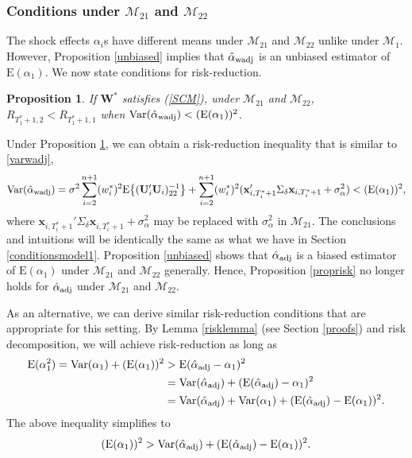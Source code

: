 \documentclass[11pt]{article}
\def\mbf#1{\mathbf{#1}} %
\def\mrm#1{\mathrm{#1}} %
\def\mc#1{\mathcal{#1}} %
\def\E#1{\mathrm{E}(#1)} %
\def\var#1{\mathrm{Var}(#1)} %
\newtheorem{prop}{Proposition}
\theoremstyle{definition}
\begin{document}
\subsubsection{Conditions under $\mc{M}_{21}$ and $\mc{M}_{22}$}
\label{conditionsm2122}

The shock effects $\alpha_i$s have different means under $\mc{M}_{21}$ and $\mc{M}_{22}$ unlike under $\mc{M}_1$. %
However, Proposition \ref{unbiased} implies that $\hat{\alpha}_{\rm wadj}$ is an unbiased estimator of $\E{\alpha_1}$. %
We now state conditions for risk-reduction.

\begin{prop}
\label{propriskwadj2} If $\mbf{W}^*$ satisfies (\ref{SCM}), under $\mc{M}_{21}$ and $\mc{M}_{22}$, $R_{T_1^*+1,2}<R_{T_1^*+1,1}$ when $\var{\hat{\alpha}_{\rm wadj}}<(\E{\alpha_1})^2$. 
\end{prop}
Under Proposition \ref{propriskwadj2}, we can obtain a risk-reduction inequality that is similar to \eqref{varwadj},
\begin{align*}
\var{\hat{\alpha}_{\rm wadj}}
 = \sigma^2\sum_{i=2}^{n+1}(w_i^*)^2\mrm{E}\big\{(\mbf{U}'_i\mbf{U}_i)^{-1}_{22}\big\} + \sum_{i=2}^{n+1} (w_i^*)^2 (\mbf{x}_{i, T_i^*+1}'\Sigma_{\delta}\mbf{x}_{i, T_i^*+1} + \sigma^2_{\alpha}) < (\E{\alpha_1})^2,
\end{align*}
where $\mbf{x}_{i, T_i^*+1}'\Sigma_{\delta}\mbf{x}_{i, T_i^*+1} + \sigma^2_{\alpha}$ may be replaced with $\sigma^2_{\alpha}$ in $\mc{M}_{21}$. The conclusions and intuitions will be identically the same as what we have in Section \ref{conditionsmodel1}. Proposition \ref{unbiased} shows that $\hat{\alpha}_{\rm adj}$ is a biased estimator of $\E{\alpha_1}$ under $\mc{M}_{21}$ and $\mc{M}_{22}$ generally. Hence, Proposition \ref{proprisk} no longer holds for $\hat{\alpha}_{\rm adj}$ under $\mc{M}_{21}$ and $\mc{M}_{22}$.

As an alternative, we can derive similar risk-reduction conditions that are appropriate for this setting. By Lemma \ref{risklemma} (see Section \ref{proofs}) and risk decomposition, we will achieve risk-reduction as long as
\begin{align*}
 \E{\alpha_1^2}= \var{\alpha_1}+(\E{\alpha_1})^2
 &>\E{\hat{\alpha}_{\rm adj}-\alpha_1}^2\\
  &=\var{\hat{\alpha}_{\rm adj}} +  (\E{\hat{\alpha}_{\rm adj}}-\alpha_1)^2 \\
  &=\var{\hat{\alpha}_{\rm adj}} +  \var{\alpha_1} + (\E{\hat{\alpha}_{\rm adj}}-\E{\alpha_1})^2.
\end{align*}
The above inequality simplifies to 
\begin{equation} \label{ineq}
 (\E{\alpha_1})^2 >\var{\hat{\alpha}_{\rm adj}}+ (\E{\hat{\alpha}_{\rm adj}}-\E{\alpha_1})^2.
\end{equation}
\end{document}
